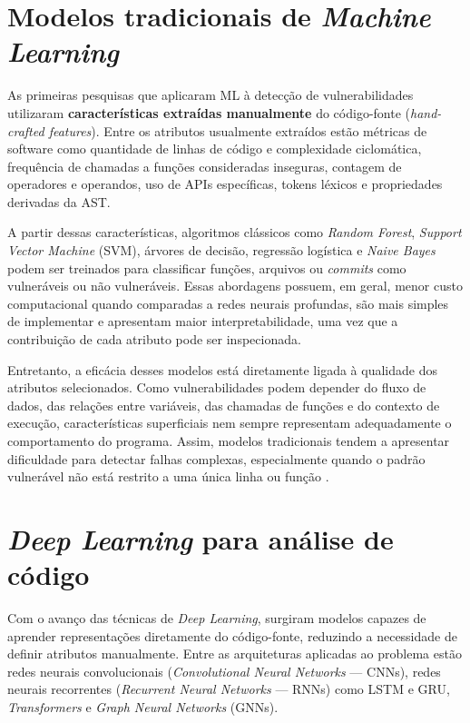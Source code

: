 \section{Modelos tradicionais de \textit{Machine Learning}}
\label{sec:ml_tradicional}

As primeiras pesquisas que aplicaram ML à detecção de vulnerabilidades
utilizaram \textbf{características extraídas manualmente} do código-fonte
(\textit{hand-crafted features}). Entre os atributos usualmente extraídos
estão métricas de software como quantidade de linhas de código e
complexidade ciclomática, frequência de chamadas a funções consideradas
inseguras, contagem de operadores e operandos, uso de APIs específicas,
tokens léxicos e propriedades derivadas da AST.

A partir dessas características, algoritmos clássicos como
\textit{Random Forest}, \textit{Support Vector Machine} (SVM), árvores de
decisão, regressão logística e \textit{Naive Bayes} podem ser treinados
para classificar funções, arquivos ou \textit{commits} como vulneráveis
ou não vulneráveis. Essas abordagens possuem, em geral, menor custo
computacional quando comparadas a redes neurais profundas, são mais
simples de implementar e apresentam maior interpretabilidade, uma vez
que a contribuição de cada atributo pode ser inspecionada.

Entretanto, a eficácia desses modelos está diretamente ligada à
qualidade dos atributos selecionados. Como vulnerabilidades podem
depender do fluxo de dados, das relações entre variáveis, das chamadas
de funções e do contexto de execução, características superficiais nem
sempre representam adequadamente o comportamento do programa. Assim,
modelos tradicionais tendem a apresentar dificuldade para detectar
falhas complexas, especialmente quando o padrão vulnerável não está
restrito a uma única linha ou função \cite{chakraborty2021survey}.

\newpage
\section{\textit{Deep Learning} para análise de código}
\label{sec:deep_learning}

Com o avanço das técnicas de \textit{Deep Learning}, surgiram modelos
capazes de aprender representações diretamente do código-fonte,
reduzindo a necessidade de definir atributos manualmente. Entre as
arquiteturas aplicadas ao problema estão redes neurais convolucionais
(\textit{Convolutional Neural Networks} — CNNs), redes neurais
recorrentes (\textit{Recurrent Neural Networks} — RNNs) como LSTM e GRU,
\textit{Transformers} e \textit{Graph Neural Networks} (GNNs).

